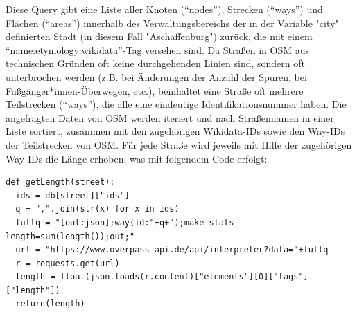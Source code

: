 \documentclass[ngerman,twocolumn,showpacs,%
  nofootinbib,aps,superscriptaddress,%
  eqsecnum,prd,notitlepage,showkeys,10pt,report]{revtex4-2}
\begin{document}
Diese Query gibt eine Liste aller Knoten (“nodes”), Strecken (“ways”) und Flächen (“areas”)
innerhalb des Verwaltungsbereichs der in der Variable "city" definierten Stadt (in diesem Fall "Aschaffenburg") zurück, die mit einem
“name:etymology:wikidata”-Tag versehen sind.
Da Straßen in OSM aus technischen Gründen oft keine durchgehenden Linien sind, sondern
oft unterbrochen werden (z.B. bei Änderungen der Anzahl der Spuren, bei
Fußgänger*innen-Überwegen, etc.), beinhaltet eine Straße oft mehrere Teilstrecken
(“ways”), die alle eine eindeutige Identifikationsnummer haben.
Die angefragten Daten von OSM werden iteriert und nach Straßennamen in einer Liste
sortiert, zusammen mit den zugehörigen Wikidata-IDs sowie den Way-IDs der Teilstrecken
von OSM.
Für jede Straße wird jeweils mit Hilfe der zugehörigen Way-IDs die Länge erhoben, was mit
folgendem Code erfolgt:
\begin{lstlisting}
def getLength(street):
  ids = db[street]["ids"]
  q = ",".join(str(x) for x in ids)
  fullq = "[out:json];way(id:"+q+");make stats length=sum(length());out;"
  url = "https://www.overpass-api.de/api/interpreter?data="+fullq
  r = requests.get(url)
  length = float(json.loads(r.content)["elements"][0]["tags"]["length"])
  return(length)
\end{lstlisting}
\end{document}
